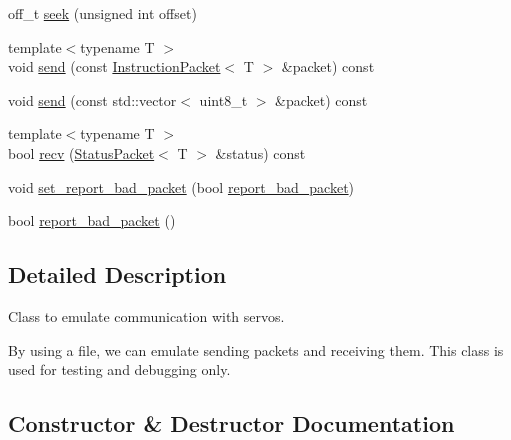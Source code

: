 \begin{DoxyCompactItemize}
\item 
off\+\_\+t \hyperlink{classdynamixel_1_1controllers_1_1_file2_dynamixel_a7d4e1bf3c961bbb85076dea02bb0973c}{seek} (unsigned int offset)
\item 
{\footnotesize template$<$typename T $>$ }\\void \hyperlink{classdynamixel_1_1controllers_1_1_file2_dynamixel_a42df7df1aec98cc3a2d7e67a74ec7143}{send} (const \hyperlink{classdynamixel_1_1_instruction_packet}{Instruction\+Packet}$<$ T $>$ \&packet) const 
\item 
void \hyperlink{classdynamixel_1_1controllers_1_1_file2_dynamixel_a1f442be2a853163124752cba55cb74c6}{send} (const std\+::vector$<$ uint8\+\_\+t $>$ \&packet) const 
\item 
{\footnotesize template$<$typename T $>$ }\\bool \hyperlink{classdynamixel_1_1controllers_1_1_file2_dynamixel_a9406deddb75f65dd427e4e415f49af40}{recv} (\hyperlink{classdynamixel_1_1_status_packet}{Status\+Packet}$<$ T $>$ \&status) const 
\item 
void \hyperlink{classdynamixel_1_1controllers_1_1_file2_dynamixel_afceda9d7938423c7133a1008436b6dee}{set\+\_\+report\+\_\+bad\+\_\+packet} (bool \hyperlink{classdynamixel_1_1controllers_1_1_file2_dynamixel_a961c4a04cfaff34dd9cb71c098b824ca}{report\+\_\+bad\+\_\+packet})
\item 
bool \hyperlink{classdynamixel_1_1controllers_1_1_file2_dynamixel_a961c4a04cfaff34dd9cb71c098b824ca}{report\+\_\+bad\+\_\+packet} ()
\end{DoxyCompactItemize}


\subsection{Detailed Description}
Class to emulate communication with servos.

By using a file, we can emulate sending packets and receiving them. This class is used for testing and debugging only. 

\subsection{Constructor \& Destructor Documentation}
